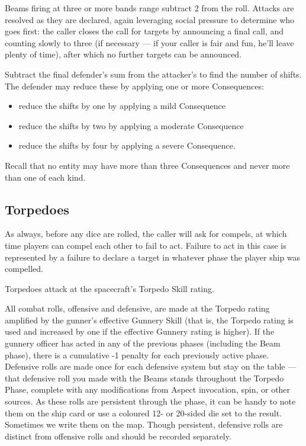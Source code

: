 Beams firing at three or more bands range subtract 2 from the roll. Attacks are resolved as they are declared, again leveraging social pressure to determine who goes first: the caller closes the call for targets by announcing a final call, and counting slowly to three (if necessary --- if your caller is fair and fun, he'll leave plenty of time), after which no further targets can be announced.

Subtract the final defender's sum from the attacker's to find the number of shifts. The defender may reduce these by applying one or more Consequences:
\begin{itemize}
\item reduce the shifts by one by applying a mild Consequence
\item reduce the shifts by two by applying a moderate Consequence
\item reduce the shifts by four by applying a severe Consequence.
\end{itemize}

Recall that no entity may have more than three Consequences and never more than one of each kind.


\subsection{Torpedoes}\label{sec:Torpedoes} %

As always, before any dice are rolled, the caller will ask for compels, at which time players can compel each other to fail to act. Failure to act in this case is represented by a failure to declare a target in whatever phase the player ship was compelled.

Torpedoes attack at the spacecraft's Torpedo Skill rating.

All combat rolls, offensive and defensive, are made at the Torpedo rating amplified by the gunner's effective Gunnery Skill (that is, the Torpedo rating is used and increased by one if the effective Gunnery rating is higher). If the gunnery officer has acted in any of the previous phases (including the Beam phase), there is a cumulative -1 penalty for each previously active phase. Defensive rolls are made once for each defensive system but stay on the table --- that  defensive roll you made with the Beams stands throughout the Torpedo Phase, complete with any modifications from Aspect invocation, spin, or other sources. As these rolls are persistent through the phase, it can be handy to note them on the ship card or use a coloured 12- or 20-sided die set to the result. Sometimes we write them on the map. Though persistent, defensive rolls are distinct from offensive rolls and should be recorded separately.

